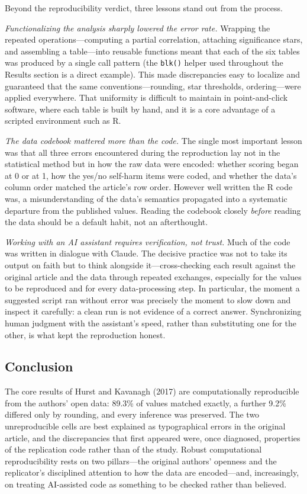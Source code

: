 \documentclass[
  english,
  man,floatsintext]{apa6}
\begin{document}
Beyond the reproducibility verdict, three lessons stand out from the process.

\emph{Functionalizing the analysis sharply lowered the error rate.} Wrapping the repeated operations---computing a partial correlation, attaching significance stars, and assembling a table---into reusable functions meant that each of the six tables was produced by a single call pattern (the \texttt{blk()} helper used throughout the Results section is a direct example). This made discrepancies easy to localize and guaranteed that the same conventions---rounding, star thresholds, ordering---were applied everywhere. That uniformity is difficult to maintain in point-and-click software, where each table is built by hand, and it is a core advantage of a scripted environment such as R.

\emph{The data codebook mattered more than the code.} The single most important lesson was that all three errors encountered during the reproduction lay not in the statistical method but in how the raw data were encoded: whether scoring began at 0 or at 1, how the yes/no self-harm items were coded, and whether the data's column order matched the article's row order. However well written the R code was, a misunderstanding of the data's semantics propagated into a systematic departure from the published values. Reading the codebook closely \emph{before} reading the data should be a default habit, not an afterthought.

\emph{Working with an AI assistant requires verification, not trust.} Much of the code was written in dialogue with Claude. The decisive practice was not to take its output on faith but to think alongside it---cross-checking each result against the original article and the data through repeated exchanges, especially for the values to be reproduced and for every data-processing step. In particular, the moment a suggested script ran without error was precisely the moment to slow down and inspect it carefully: a clean run is not evidence of a correct answer. Synchronizing human judgment with the assistant's speed, rather than substituting one for the other, is what kept the reproduction honest.

\subsection{Conclusion}\label{conclusion}

The core results of Hurst and Kavanagh (2017) are computationally reproducible from the authors' open data: 89.3\% of values matched exactly, a further 9.2\% differed only by rounding, and every inference was preserved. The two unreproducible cells are best explained as typographical errors in the original article, and the discrepancies that first appeared were, once diagnosed, properties of the replication code rather than of the study. Robust computational reproducibility rests on two pillars---the original authors' openness and the replicator's disciplined attention to how the data are encoded---and, increasingly, on treating AI-assisted code as something to be checked rather than believed.
\end{document}
